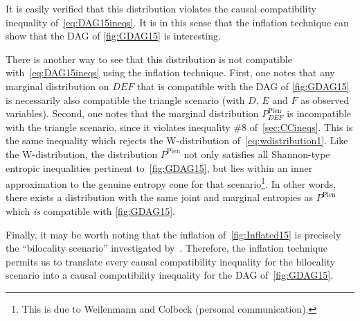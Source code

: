 {It is easily verified that this distribution violates the causal compatibility inequality of~\cref{eq:DAG15ineqs}.  It is in this sense that the inflation technique can show that the DAG of \cref{fig:GDAG15} is interesting. 

There is another way to see that this distribution is not compatible with~\cref{eq:DAG15ineqs} using the inflation technique.  First, one notes that any marginal distribution on $DEF$ that is compatible with the DAG of \cref{fig:GDAG15} is necessarily also compatible the triangle scenario (with $D$, $E$ and $F$ as observed variables).
Second, one notes that the marginal distribution $P^{\text{Pien}}_{D E F}$ is incompatible with the triangle scenario, since it violates inequality \#8 of~\cref{sec:CCineqs}.  This is the same inequality which rejects the W-distribution of~\cref{eq:wdistribution1}.
Like the W-distribution, the distribution $P^{\text{Pien}}$
 not only satisfies all Shannon-type entropic inequalities pertinent to~\cref{fig:GDAG15}, but lies within an inner approximation to the genuine entropy cone for that scenario\footnote{This is due to Weilenmann and Colbeck (personal communication).}. In other words, there exists a distribution with the same joint and marginal entropies as  $P^{\text{Pien}}$ which \emph{is} compatible with \cref{fig:GDAG15}.

Finally, it may be worth noting that the inflation of~\cref{fig:Inflated15} is precisely the ``bilocality scenario'' investigated by~\citet{BilocalCorrelations}.  Therefore, the inflation technique permits us to translate every causal compatibility inequality for the bilocality scenario into a causal compatibility inequality for the DAG of~\cref{fig:GDAG15}.




}
